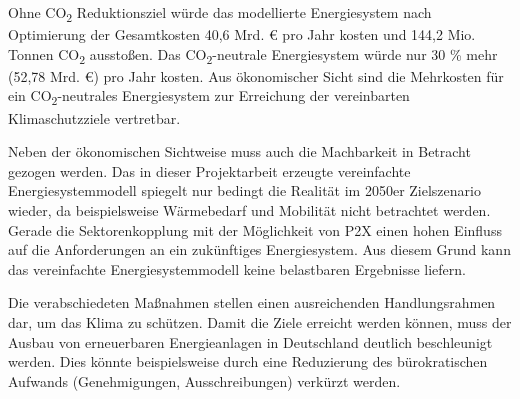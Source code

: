 Ohne CO\textsubscript{2} Reduktionsziel würde das modellierte Energiesystem nach Optimierung der Gesamtkosten 40,6 Mrd. € pro Jahr kosten und 144,2 Mio. Tonnen CO\textsubscript{2} ausstoßen. Das CO\textsubscript{2}-neutrale Energiesystem würde nur 30 \% mehr (52,78 Mrd. €) pro Jahr kosten. 
Aus ökonomischer Sicht sind die Mehrkosten für ein CO\textsubscript{2}-neutrales Energiesystem zur Erreichung der vereinbarten Klimaschutzziele vertretbar.

Neben der ökonomischen Sichtweise muss auch die Machbarkeit in Betracht gezogen werden.
Das in dieser Projektarbeit erzeugte vereinfachte Energiesystemmodell spiegelt nur bedingt die Realität im 2050er Zielszenario wieder, da beispielsweise Wärmebedarf und Mobilität nicht betrachtet werden. Gerade die Sektorenkopplung mit der Möglichkeit von P2X einen hohen Einfluss auf die Anforderungen an ein zukünftiges Energiesystem. Aus diesem Grund kann das vereinfachte Energiesystemmodell keine belastbaren Ergebnisse liefern.

Die verabschiedeten Maßnahmen stellen einen ausreichenden Handlungsrahmen dar, um das Klima zu schützen. Damit die Ziele erreicht werden können, muss der Ausbau von erneuerbaren Energieanlagen in Deutschland deutlich beschleunigt werden. Dies könnte beispielsweise durch eine Reduzierung des bürokratischen Aufwands (Genehmigungen, Ausschreibungen) verkürzt werden.
